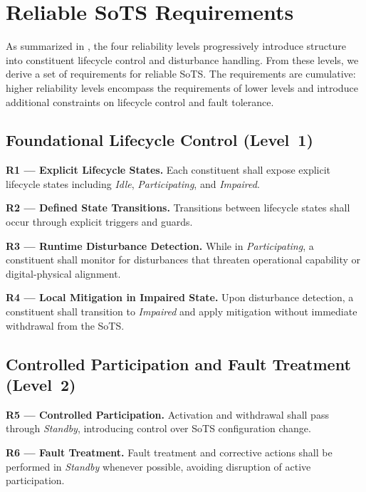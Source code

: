 \section{Reliable SoTS Requirements}
\label{sec:reliable-sots-requirements}



As summarized in , the four reliability levels progressively introduce structure into constituent lifecycle control and disturbance handling. From these levels, we derive a set of requirements for reliable SoTS. The requirements are cumulative: higher reliability levels encompass the requirements of lower levels and introduce additional constraints on lifecycle control and fault tolerance.


\subsection{Foundational Lifecycle Control (Level~1)}

\textbf{R1 — Explicit Lifecycle States.}  
Each constituent shall expose explicit lifecycle states including \emph{Idle}, \emph{Participating}, and \emph{Impaired}.

\noindent 
\textbf{R2 — Defined State Transitions.}  
Transitions between lifecycle states shall occur through explicit triggers and guards.

\noindent 
\textbf{R3 — Runtime Disturbance Detection.}  
While in \emph{Participating}, a constituent shall monitor for disturbances that threaten operational capability or digital-physical alignment.

\noindent 
\textbf{R4 — Local Mitigation in Impaired State.}  
Upon disturbance detection, a constituent shall transition to \emph{Impaired} and apply mitigation without immediate withdrawal from the SoTS.


\subsection{Controlled Participation and Fault Treatment (Level~2)}
 
\textbf{R5 — Controlled Participation.}  
Activation and withdrawal shall pass through \emph{Standby}, introducing control over SoTS configuration change.

\noindent
\textbf{R6 — Fault Treatment.}  
Fault treatment and corrective actions shall be performed in \emph{Standby} whenever possible, avoiding disruption of active participation.


